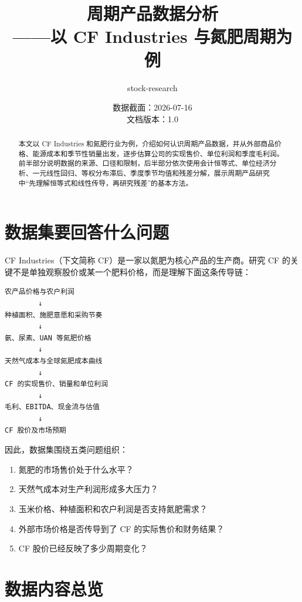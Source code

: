 \documentclass[11pt,a4paper]{ctexart}
\title{周期产品数据分析\\——以 CF Industries 与氮肥周期为例}
\author{stock-research}
\date{数据截面：2026-07-16\\文档版本：1.0}
\begin{document}
\maketitle

\begin{abstract}
本文以 CF Industries 和氮肥行业为例，介绍如何认识周期产品数据，并从外部商品价格、能源成本和季节性销量出发，逐步估算公司的实现售价、单位利润和季度毛利润。前半部分说明数据的来源、口径和限制，后半部分依次使用会计恒等式、单位经济分析、一元线性回归、等权分布滞后、季度季节均值和残差分解，展示周期产品研究中“先理解恒等式和线性传导，再研究残差”的基本方法。
\end{abstract}

\tableofcontents
\newpage

\section{数据集要回答什么问题}

CF Industries（下文简称 CF）是一家以氮肥为核心产品的生产商。研究 CF 的关键不是单独观察股价或某一个肥料价格，而是理解下面这条传导链：

\begin{verbatim}
农产品价格与农户利润
        ↓
种植面积、施肥意愿和采购节奏
        ↓
氨、尿素、UAN 等氮肥价格
        ↓
天然气成本与全球氮肥成本曲线
        ↓
CF 的实现售价、销量和单位利润
        ↓
毛利、EBITDA、现金流与估值
        ↓
CF 股价及市场预期
\end{verbatim}

因此，数据集围绕五类问题组织：

\begin{enumerate}
  \item 氮肥的市场售价处于什么水平？
  \item 天然气成本对生产利润形成多大压力？
  \item 玉米价格、种植面积和农户利润是否支持氮肥需求？
  \item 外部市场价格是否传导到了 CF 的实际售价和财务结果？
  \item CF 股价已经反映了多少周期变化？
\end{enumerate}

\section{数据内容总览}
\end{document}
